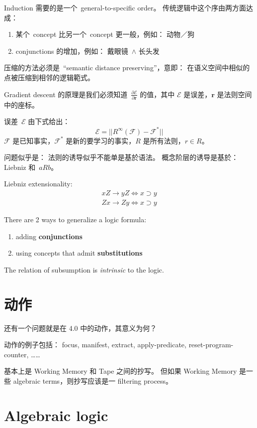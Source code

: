 Induction 需要的是一个\  general-to-specific order。  传统逻辑中这个序由两方面达成：
\begin{enumerate}
\item 某个\  concept 比另一个\  concept 更一般，例如： 动物／狗
\item conjunctions 的增加，例如： 戴眼镜\  $\wedge$ 长头发
\end{enumerate}

压缩的方法必须是\  ``semantic distance preserving''，意即： 在语义空间中相似的点被压缩到相邻的逻辑範式。

Gradient descent 的原理是我们必须知道\  $\frac{\partial\mathcal{E}}{\partial\mathbf{r}}$ 的值，其中 $\mathcal{E}$ 是误差，$\mathbf{r}$ 是法则空间中的座标。

误差\  $\mathcal{E}$ 由下式给出：
$$ \mathcal{E} = || R^\infty(\mathcal{F}) - \mathcal{F}^* || $$ 
$\mathcal{F}$ 是已知事实，$\mathcal{F}^*$ 是新的要学习的事实，$R$ 是所有法则，$r \in R$。

问题似乎是： 法则的诱导似乎不能单是基於语法。 概念阶层的诱导是基於： Liebniz 和\  $a R b$。

Liebniz extensionality:
\begin{eqnarray}
xZ \rightarrow yZ \Leftrightarrow x \supset y \\
Zx \rightarrow Zy \Leftrightarrow x \supset y
\end{eqnarray}

There are 2 ways to generalize a logic formula:
\begin{enumerate}
\item adding \textbf{conjunctions}
\item using concepts that admit \textbf{substitutions}
\end{enumerate}

The relation of subsumption is \textit{intrinsic} to the logic.  

\section{动作}

还有一个问题就是在 4.0 中的动作，其意义为何？

动作的例子包括： focus, manifest, extract, apply-predicate, reset-program-counter, ……

基本上是 Working Memory 和 Tape 之间的抄写。  但如果 Working Memory 是一些 algebraic terms，则抄写应该是一 filtering process。

\section{Algebraic logic}

